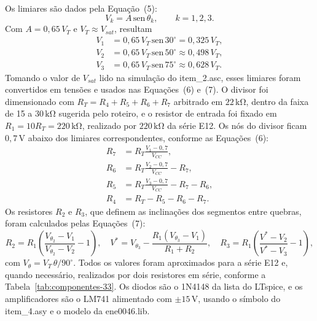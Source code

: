 \documentclass[11pt,a4paper]{article}
\begin{document}
Os limiares são dados pela Equação~(5):
\begin{equation}
V_k = A\,\mathrm{sen}\,\theta_k, \qquad k = 1, 2, 3.
\end{equation}
Com \(A = 0{,}65\,V_T\) e \(V_T \approx V_{sat}\), resultam
\begin{align}
V_1 &= 0{,}65\,V_T\,\mathrm{sen}\,30^\circ = 0{,}325\,V_T, \\
V_2 &= 0{,}65\,V_T\,\mathrm{sen}\,50^\circ \approx 0{,}498\,V_T, \\
V_3 &= 0{,}65\,V_T\,\mathrm{sen}\,75^\circ \approx 0{,}628\,V_T.
\end{align}
Tomando o valor de \(V_{sat}\) lido na simulação do item\_2.asc, esses limiares foram convertidos em tensões e usados nas Equações~(6) e~(7). O divisor foi dimensionado com \(R_T = R_4 + R_5 + R_6 + R_7\) arbitrado em \(22\,\mathrm{k\Omega}\), dentro da faixa de 15 a \(30\,\mathrm{k\Omega}\) sugerida pelo roteiro, e o resistor de entrada foi fixado em \(R_1 = 10R_T = 220\,\mathrm{k\Omega}\), realizado por \(220\,\mathrm{k\Omega}\) da série E12. Os nós do divisor ficam \(0{,}7\,\mathrm{V}\) abaixo dos limiares correspondentes, conforme as Equações~(6):
\begin{align}
R_7 &= R_T\frac{V_1 - 0{,}7}{V_{CC}}, \\
R_6 &= R_T\frac{V_2 - 0{,}7}{V_{CC}} - R_7, \\
R_5 &= R_T\frac{V_3 - 0{,}7}{V_{CC}} - R_7 - R_6, \\
R_4 &= R_T - R_5 - R_6 - R_7.
\end{align}
Os resistores \(R_2\) e \(R_3\), que definem as inclinações dos segmentos entre quebras, foram calculados pelas Equações~(7):
\begin{equation}
R_2 = R_1\left(\frac{V_{\theta_2} - V_1}{V_{\theta_2} - V_2} - 1\right), \quad
V^* = V_{\theta_3} - \frac{R_1(V_{\theta_3} - V_1)}{R_1 + R_2}, \quad
R_3 = R_1\left(\frac{V^* - V_2}{V^* - V_3} - 1\right),
\end{equation}
com \(V_\theta = V_T\,\theta/90^\circ\). Todos os valores foram aproximados para a série E12 e, quando necessário, realizados por dois resistores em série, conforme a Tabela~\ref{tab:componentes-33}. Os diodos são o 1N4148 da lista do LTspice, e os amplificadores são o LM741 alimentado com \(\pm15\,\mathrm{V}\), usando o símbolo do item\_4.asy e o modelo da ene0046.lib.
\end{document}
